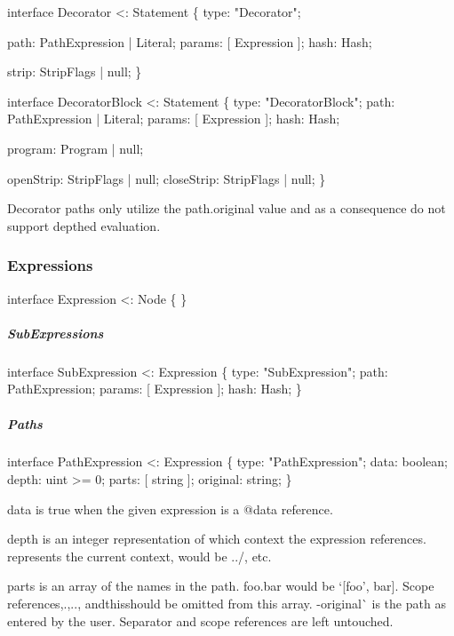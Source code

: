 \begin{DoxyCode}
\textcolor{keyword}{interface }Decorator <: Statement \{
    type: \textcolor{stringliteral}{"Decorator"};

    path: PathExpression | Literal;
    params: [ Expression ];
    hash: Hash;

    strip: StripFlags | null;
\}

\textcolor{keyword}{interface }DecoratorBlock <: Statement \{
    type: \textcolor{stringliteral}{"DecoratorBlock"};
    path: PathExpression | Literal;
    params: [ Expression ];
    hash: Hash;

    program: Program | null;

    openStrip: StripFlags | null;
    closeStrip: StripFlags | null;
\}
\end{DoxyCode}


Decorator paths only utilize the {\ttfamily path.\+original} value and as a consequence do not support depthed evaluation.

\subsubsection*{Expressions}


\begin{DoxyCode}
\textcolor{keyword}{interface }Expression <: Node \{ \}
\end{DoxyCode}


\subparagraph*{Sub\+Expressions}


\begin{DoxyCode}
\textcolor{keyword}{interface }SubExpression <: Expression \{
    type: \textcolor{stringliteral}{"SubExpression"};
    path: PathExpression;
    params: [ Expression ];
    hash: Hash;
\}
\end{DoxyCode}


\subparagraph*{Paths}


\begin{DoxyCode}
\textcolor{keyword}{interface }PathExpression <: Expression \{
    type: \textcolor{stringliteral}{"PathExpression"};
    data: boolean;
    depth: uint >= 0;
    parts: [ string ];
    original: string;
\}
\end{DoxyCode}



\begin{DoxyItemize}
\item {\ttfamily data} is true when the given expression is a {\ttfamily @data} reference.
\item {\ttfamily depth} is an integer representation of which context the expression references. {} represents the current context, {} would be {\ttfamily ../}, etc.
\item {\ttfamily parts} is an array of the names in the path. {\ttfamily foo.\+bar} would be `\mbox{[}\textquotesingle{}foo', \textquotesingle{}bar\textquotesingle{}\mbox{]}{\ttfamily . Scope references,}.{\ttfamily ,}..{\ttfamily , and}this{\ttfamily should be omitted from this array. -\/}original\`{} is the path as entered by the user. Separator and scope references are left untouched.
\end{DoxyItemize}

